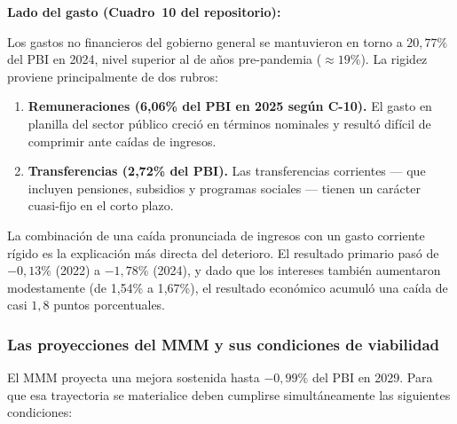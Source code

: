 \documentclass[12pt, a4paper]{article}
\newcommand{\emp}[1]{\textbf{#1}}
\begin{document}
\bigskip
\noindent\textbf{Lado del gasto (Cuadro~10 del repositorio):}

Los gastos no financieros del gobierno general se mantuvieron en torno a
$20{,}77\%$ del PBI en 2024, nivel superior al de años pre-pandemia
($\approx19\%$). La rigidez proviene principalmente de dos rubros:

\begin{enumerate}[leftmargin=1.5em]
    \item \emp{Remuneraciones (6{,}06\% del PBI en 2025 según C-10).} El gasto
          en planilla del sector público creció en términos nominales y
          resultó difícil de comprimir ante caídas de ingresos.
    \item \emp{Transferencias (2{,}72\% del PBI).} Las transferencias corrientes
          --- que incluyen pensiones, subsidios y programas sociales ---
          tienen un carácter cuasi-fijo en el corto plazo.
\end{enumerate}

La combinación de una caída pronunciada de ingresos con un gasto corriente
rígido es la explicación más directa del deterioro. El resultado primario
pasó de $-0{,}13\%$ (2022) a $-1{,}78\%$ (2024), y dado que los intereses
también aumentaron modestamente (de 1{,}54\% a 1{,}67\%), el resultado
económico acumuló una caída de casi $1{,}8$ puntos porcentuales.

\subsubsection*{Las proyecciones del MMM y sus condiciones de viabilidad}

El MMM proyecta una mejora sostenida hasta $-0{,}99\%$ del PBI en 2029.
Para que esa trayectoria se materialice deben cumplirse simultáneamente
las siguientes condiciones:
\end{document}
